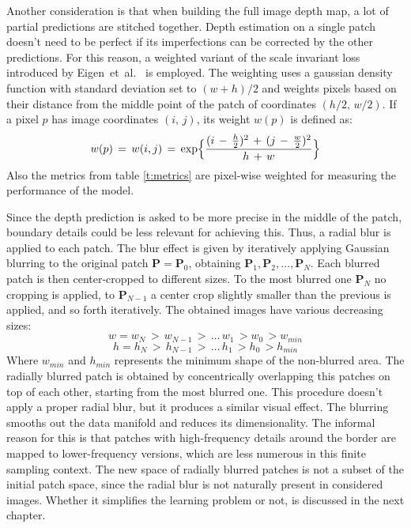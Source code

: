Another consideration is that when building the full image depth map, a lot of partial predictions are stitched together.
Depth estimation on a single patch doesn't need to be perfect if its imperfections can be corrected by the other predictions.
For this reason, a weighted variant of the scale invariant loss introduced by Eigen~et~al.~\cite{Eigen} is employed.
The weighting uses a gaussian density function with standard deviation set to $(w + h) / 2$ and weights pixels based on their distance from the middle point of the patch of coordinates $(h/2, \, w/2)$.
If a pixel $p$ has image coordinates $(i, \, j)$, its weight $w(p)$ is defined as:
\[
    w(p) \, = \, w(i, j) \, = \,
    \text{exp} \Bigl\{
        \frac{
            (i \, - \, \frac{h}{2})^{2} \, + \,
            (j \, - \, \frac{w}{2})^{2}
        }{
            h \, + \, w
        }
    \Bigr\}
\]
Also the metrics from table \ref{t:metrics} are pixel-wise weighted for measuring the performance of the model.

Since the depth prediction is asked to be more precise in the middle of the patch, boundary details could be less relevant for achieving this.
Thus, a radial blur is applied to each patch.
The blur effect is given by iteratively applying Gaussian blurring to the original patch $\mathbf{P} = \mathbf{P}_{0}$, obtaining $\mathbf{P}_{1}, \mathbf{P}_{2}, \dotsc, \mathbf{P}_{N}$.
Each blurred patch is then center-cropped to different sizes.
To the most blurred one $\mathbf{P}_{N}$ no cropping is applied, to $\mathbf{P}_{N-1}$ a center crop slightly smaller than the previous is applied, and so forth iteratively.
The obtained images have various decreasing sizes:
\[
    w = w_{N} \, > \, w_{N-1} \, > \, \dotsc \, w_{1} \, > w_{0} \, > w_{min}
\]\[
    h = h_{N} \, > \, h_{N-1} \, > \, \dotsc \, h_{1} \, > h_{0} \, > h_{min}
\]
Where $w_{min}$ and $h_{min}$ represents the minimum shape of the non-blurred area.
The radially blurred patch is obtained by concentrically overlapping this patches on top of each other, starting from the most blurred one.
This procedure doesn't apply a proper radial blur, but it produces a similar visual effect.
The blurring smooths out the data manifold and reduces its dimensionality.
The informal reason for this is that patches with high-frequency details around the border are mapped to lower-frequency versions, which are less numerous in this finite sampling context.
The new space of radially blurred patches is not a subset of the initial patch space, since the radial blur is not naturally present in considered images.
Whether it simplifies the learning problem or not, is discussed in the next chapter.

